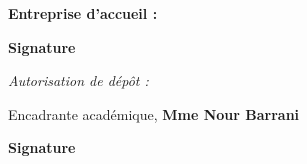 \thispagestyle{empty}

\begin{center}
    \begin{minipage}[t]{0.46\columnwidth}
        \begin{tcolorbox}[colback=white,boxrule=5pt,arc=10pt,height=50mm]{
            \vspace{1cm}
            \large
            \textbf{Entreprise d'accueil :}
            \begin{center}
                \Large\textbf{\@companyName}
            \end{center}
            \vspace{0.3cm}
            \hspace{0.74\columnwidth}\textbf{\large Signature}
        }
        \end{tcolorbox}
    \end{minipage}
    \hfill
    \begin{minipage}[t]{0.46\columnwidth}
        \begin{tcolorbox}[colback=white,boxrule=5pt,arc=10pt,height=105mm]{
            \vspace{1cm}
            \large \textit{Autorisation de dépôt :}
            \vspace{1mm}
            \@academicSignSentence
            \vspace{1mm}
            \begin{center}
                \Large
                Encadrante académique, \textbf{Mme Nour Barrani}
            \end{center}
            \vspace{5mm}
            \hspace{0.74\columnwidth}\textbf{\large Signature}
        }
        \end{tcolorbox}
    \end{minipage}
\end{center}
